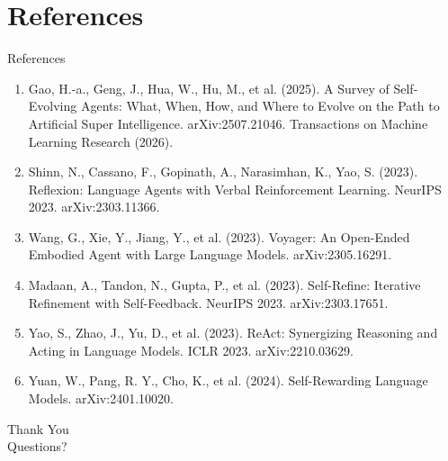 \documentclass[10pt]{beamer}
\begin{document}
\section{References}
\begin{frame}[allowframebreaks]{References}
  \footnotesize
  \begin{enumerate}
    \item Gao, H.-a., Geng, J., Hua, W., Hu, M., et al. (2025). A Survey of Self-Evolving Agents: What, When, How, and Where to Evolve on the Path to Artificial Super Intelligence. arXiv:2507.21046. Transactions on Machine Learning Research (2026).
    \item Shinn, N., Cassano, F., Gopinath, A., Narasimhan, K., Yao, S. (2023). Reflexion: Language Agents with Verbal Reinforcement Learning. NeurIPS 2023. arXiv:2303.11366.
    \item Wang, G., Xie, Y., Jiang, Y., et al. (2023). Voyager: An Open-Ended Embodied Agent with Large Language Models. arXiv:2305.16291.
    \item Madaan, A., Tandon, N., Gupta, P., et al. (2023). Self-Refine: Iterative Refinement with Self-Feedback. NeurIPS 2023. arXiv:2303.17651.
    \item Yao, S., Zhao, J., Yu, D., et al. (2023). ReAct: Synergizing Reasoning and Acting in Language Models. ICLR 2023. arXiv:2210.03629.
    \item Yuan, W., Pang, R. Y., Cho, K., et al. (2024). Self-Rewarding Language Models. arXiv:2401.10020.
  \end{enumerate}
\end{frame}
\begin{frame}[plain]
  \begin{center}
    {\Huge Thank You}\\[1em]
    {\large Questions?}
  \end{center}
\end{frame}
\end{document}
